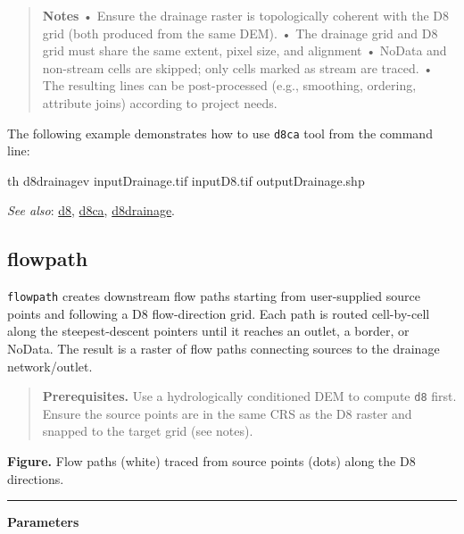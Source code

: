 \documentclass[
]{book}
\newenvironment{Shaded}{\begin{snugshade}}{\end{snugshade}}
\newcommand{\ExtensionTok}[1]{#1}
\newcommand{\NormalTok}[1]{#1}
\begin{document}
\begin{quote}
\textbf{Notes}
• Ensure the drainage raster is topologically coherent with the D8 grid (both produced from the same DEM).
• The drainage grid and D8 grid must share the same extent, pixel size, and alignment
• NoData and non-stream cells are skipped; only cells marked as stream are traced.
• The resulting lines can be post-processed (e.g., smoothing, ordering, attribute joins) according to project needs.
\end{quote}

The following example demonstrates how to use \texttt{d8ca} tool from the command line:

\begin{Shaded}
\begin{Highlighting}[]
\ExtensionTok{th}\NormalTok{ d8drainagev inputDrainage.tif inputD8.tif outputDrainage.shp}
\end{Highlighting}
\end{Shaded}

\emph{See also}: \hyperref[d8]{d8}, \hyperref[d8ca]{d8ca}, \hyperref[d8drainage]{d8drainage}.

\subsection{flowpath}\label{flowpath}

\texttt{flowpath} creates downstream flow paths starting from user-supplied source points and following a D8 flow-direction grid. Each path is routed cell-by-cell along the steepest-descent pointers until it reaches an outlet, a border, or NoData. The result is a raster of flow paths connecting sources to the drainage network/outlet.

\begin{quote}
\textbf{Prerequisites.} Use a hydrologically conditioned DEM to compute \texttt{d8} first. Ensure the source points are in the same CRS as the D8 raster and snapped to the target grid (see notes).
\end{quote}

\textbf{Figure.} Flow paths (white) traced from source points (dots) along the D8 directions.

\begin{center}\rule{0.5\linewidth}{0.5pt}\end{center}

\textbf{Parameters}
\end{document}
